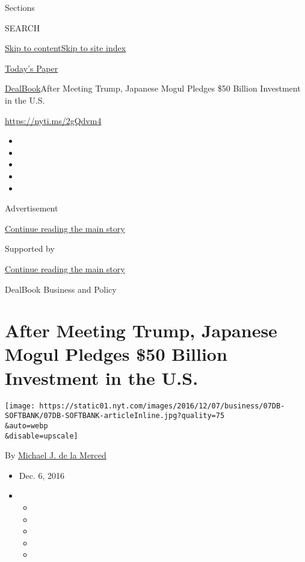 Sections

SEARCH

\protect\hyperlink{site-content}{Skip to
content}\protect\hyperlink{site-index}{Skip to site index}

\href{https://myaccount.nytimes.com/auth/login?response_type=cookie\&client_id=vi}{}

\href{https://www.nytimes.com/section/todayspaper}{Today's Paper}

\href{/section/business/dealbook}{DealBook}\textbar{}After Meeting
Trump, Japanese Mogul Pledges \$50 Billion Investment in the U.S.

\url{https://nyti.ms/2gQdvm4}

\begin{itemize}
\item
\item
\item
\item
\item
\end{itemize}

Advertisement

\protect\hyperlink{after-top}{Continue reading the main story}

Supported by

\protect\hyperlink{after-sponsor}{Continue reading the main story}

DealBook Business and Policy

\hypertarget{after-meeting-trump-japanese-mogul-pledges-50-billion-investment-in-the-us}{%
\section{After Meeting Trump, Japanese Mogul Pledges \$50 Billion
Investment in the
U.S.}\label{after-meeting-trump-japanese-mogul-pledges-50-billion-investment-in-the-us}}

\texttt{[image: https://static01.nyt.com/images/2016/12/07/business/07DB-SOFTBANK/07DB-SOFTBANK-articleInline.jpg?quality=75\\\&auto=webp\\\&disable=upscale]}

By \href{http://www.nytimes.com/by/michael-j-de-la-merced}{Michael J. de
la Merced}

\begin{itemize}
\item
  Dec. 6, 2016
\item
  \begin{itemize}
  \item
  \item
  \item
  \item
  \item
  \end{itemize}
\end{itemize}


